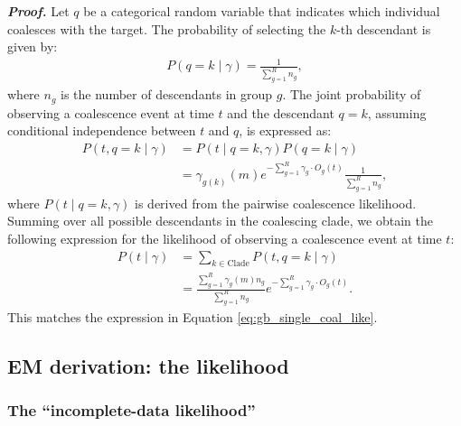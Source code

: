 \noindent \textit{\textbf{Proof.}}
Let \( q \) be a categorical random variable that indicates which individual coalesces with the target. The probability of selecting the \( k \)-th descendant is given by:
\begin{align}
    P(q = k \mid \gamma) = \frac{1}{\sum_{g=1}^R n_g},
\end{align}
where \( n_g \) is the number of descendants in group \( g \). The joint probability of observing a coalescence event at time \( t \) and the descendant \( q = k \), assuming conditional independence between \( t \) and \( q \), is expressed as:
\begin{align}
    P(t, q = k \mid \gamma) &= P(t \mid q = k, \gamma) P(q = k \mid \gamma) \nonumber \\
    &= \gamma_{g(k)}(m) e^{-\sum_{g=1}^R \gamma_g \cdot O_g(t)} \frac{1}{\sum_{g=1}^R n_g},
\end{align}
where \( P(t \mid q = k, \gamma) \) is derived from the pairwise coalescence likelihood. Summing over all possible descendants in the coalescing clade, we obtain the following expression for the likelihood of observing a coalescence event at time \( t \):
\begin{align}
    P(t \mid \gamma) &= \sum_{k \in \text{Clade}} P(t, q = k \mid \gamma) \nonumber \\
    &= \frac{\sum_{g=1}^R \gamma_g(m) n_g}{\sum_{g=1}^R n_g} e^{-\sum_{g=1}^R \gamma_g \cdot O_g(t)}.
\end{align}
This matches the expression in Equation \ref{eq:gb_single_coal_like}.

\subsection{EM derivation: the likelihood}

\subsubsection{The ``incomplete-data likelihood''}

